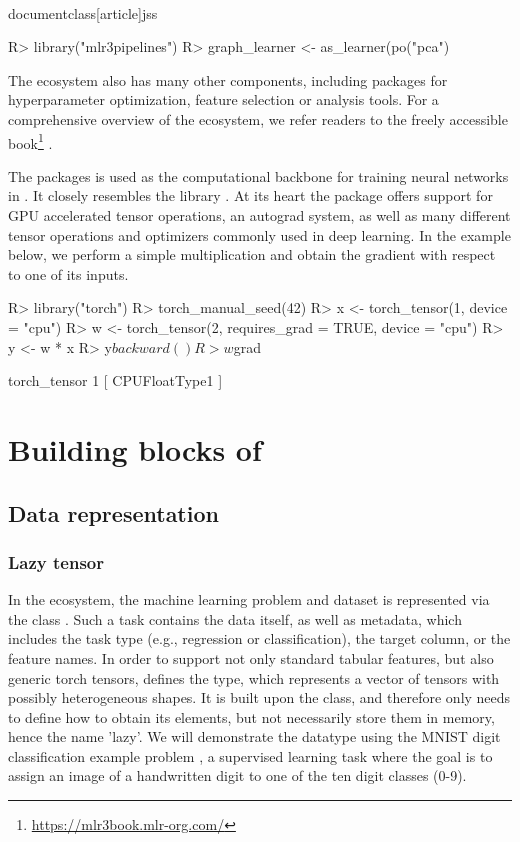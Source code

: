 \\documentclass[article]{jss}
\theoremstyle{definition}
\begin{document}
\begin{CodeInput}
R> library("mlr3pipelines")
R> graph_learner <- as_learner(po("pca") %
\end{CodeInput}

The  ecosystem also has many other components, including packages for hyperparameter optimization, feature selection or analysis tools.
For a comprehensive overview of the  ecosystem, we refer readers to the freely accessible book\footnote{\url{https://mlr3book.mlr-org.com/}} \citep{ref-mlr3book}.

The  packages is used as the computational backbone for training neural networks in .
It closely resembles the \pytorch{} \python{} library \citep{ref-pytorch}.
At its heart the package offers support for GPU accelerated tensor operations, an autograd system, as well as many different tensor operations and optimizers commonly used in deep learning.
In the example below, we perform a simple multiplication and obtain the gradient with respect to one of its inputs.

\begin{CodeInput}
R> library("torch")
R> torch_manual_seed(42)
R> x <- torch_tensor(1, device = "cpu")
R> w <- torch_tensor(2, requires_grad = TRUE, device = "cpu")
R> y <- w * x
R> y$backward()
R> w$grad
\end{CodeInput}
\begin{CodeOutput}
torch_tensor
 1
[ CPUFloatType{1} ]
\end{CodeOutput}

\section[Building blocks of mlr3torch]{Building blocks of }\label{sec:building-blocks}

\subsection{Data representation}

\subsubsection{Lazy tensor}

In the  ecosystem, the machine learning problem and dataset is represented via the  class .
Such a task contains the data itself, as well as metadata, which includes the task type (e.g., regression or classification), the target column, or the feature names.
In order to support not only standard tabular features, but also generic torch tensors,  defines the  type, which represents a vector of tensors with possibly heterogeneous shapes.
It is built upon the  class, and therefore only needs to define how to obtain its elements, but not necessarily store them in memory, hence the name 'lazy'.
We will demonstrate the datatype using the MNIST digit classification example problem \citep{ref-mnist-2012}, a supervised learning task where the goal is to assign an image of a handwritten digit to one of the ten digit classes (0-9).
\end{document}
